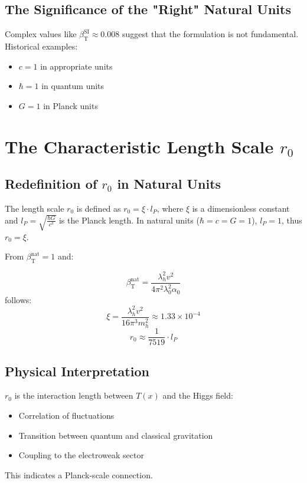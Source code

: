 \documentclass[12pt,a4paper]{article}
\newcommand{\Tfield}{T(x)}
\newcommand{\betaT}{\beta_{\text{T}}}
\begin{document}
	\subsection{The Significance of the "Right" Natural Units}
	
	Complex values like \(\betaT^{\text{SI}} \approx 0.008\) suggest that the formulation is not fundamental. Historical examples:
	\begin{itemize}
		\item \(c = 1\) in appropriate units
		\item \(\hbar = 1\) in quantum units
		\item \(G = 1\) in Planck units
	\end{itemize}
	
	\section{The Characteristic Length Scale \(r_0\)}
	
	\subsection{Redefinition of \(r_0\) in Natural Units}
	
	The length scale \(r_0\) is defined as \(r_0 = \xi \cdot l_P\), where \(\xi\) is a dimensionless constant and \(l_P = \sqrt{\frac{\hbar G}{c^3}}\) is the Planck length. In natural units (\(\hbar = c = G = 1\)), \(l_P = 1\), thus \(r_0 = \xi\).
	
	From \(\betaT^{\text{nat}} = 1\) and:
	
	
	\begin{equation}
		\betaT^{\text{nat}} = \frac{\lambda_h^2 v^2}{4\pi^2 \lambda_0^2 \alpha_0}
	\end{equation}
	follows:
	\begin{equation}
		\xi = \frac{\lambda_h^2 v^2}{16\pi^3 m_h^2} \approx 1.33 \times 10^{-4}
	\end{equation}
	\begin{equation}
		r_0 \approx \frac{1}{7519} \cdot l_P
	\end{equation}
	
	\subsection{Physical Interpretation}
	
	\(r_0\) is the interaction length between \(\Tfield\) and the Higgs field:
	\begin{itemize}
		\item Correlation of fluctuations
		\item Transition between quantum and classical gravitation
		\item Coupling to the electroweak sector
	\end{itemize}
	This indicates a Planck-scale connection.
	
\end{document}
